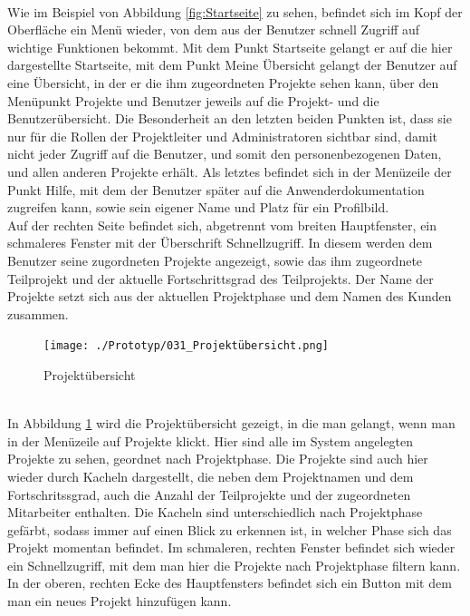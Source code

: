 \\Wie im Beispiel von Abbildung \ref{fig:Startseite} zu sehen, befindet sich im Kopf der Oberfläche ein Menü wieder, von dem aus der Benutzer schnell Zugriff auf wichtige Funktionen bekommt. Mit dem Punkt \glqq{}Startseite\grqq{} gelangt er auf die hier dargestellte Startseite, mit dem Punkt \glqq{}Meine Übersicht\grqq{} gelangt der Benutzer auf eine Übersicht, in der er die ihm zugeordneten Projekte sehen kann, über den Menüpunkt \glqq{}Projekte\grqq{} und \glqq{}Benutzer\grqq{} jeweils auf die Projekt- und die Benutzerübersicht. Die Besonderheit an den letzten beiden Punkten ist, dass sie nur für die Rollen der Projektleiter und Administratoren sichtbar sind, damit nicht jeder Zugriff auf die Benutzer, und somit den personenbezogenen Daten, und allen anderen Projekte erhält. Als letztes befindet sich in der Menüzeile der Punkt \glqq{}Hilfe\grqq{}, mit dem der Benutzer später auf die Anwenderdokumentation zugreifen kann, sowie sein eigener Name und Platz für ein Profilbild.\\Auf der rechten Seite befindet sich, abgetrennt vom breiten Hauptfenster, ein schmaleres Fenster mit der Überschrift Schnellzugriff. In diesem werden dem Benutzer seine zugordneten Projekte angezeigt, sowie das ihm zugeordnete Teilprojekt und der aktuelle Fortschrittsgrad des Teilprojekts. Der Name der Projekte setzt sich aus der aktuellen Projektphase und dem Namen des Kunden zusammen.
\begin{figure}[h!]
    \centering
    \texttt{[image: ./Prototyp/031\_Projektübersicht.png]}
    \caption[Prototyp: Projektübersicht]{Projektübersicht}
    \label{fig:Projektübersicht}
\end{figure}
\\In Abbildung \ref{fig:Projektübersicht} wird die Projektübersicht gezeigt, in die man gelangt, wenn man in der Menüzeile auf \glqq{}Projekte\grqq{} klickt. Hier sind alle im System angelegten Projekte zu sehen, geordnet nach Projektphase. Die Projekte sind auch hier wieder durch Kacheln dargestellt, die neben dem Projektnamen und dem Fortschritssgrad, auch die Anzahl der Teilprojekte und der zugeordneten Mitarbeiter enthalten. Die Kacheln sind unterschiedlich nach Projektphase gefärbt, sodass immer auf einen Blick zu erkennen ist, in welcher Phase sich das Projekt momentan befindet. Im schmaleren, rechten Fenster befindet sich wieder ein Schnellzugriff, mit dem man hier die Projekte nach Projektphase filtern kann. In der oberen, rechten Ecke des Hauptfensters befindet sich ein Button mit dem man ein neues Projekt hinzufügen kann.
